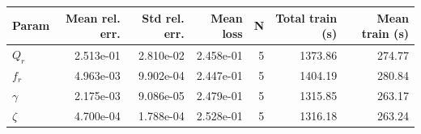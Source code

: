 \begin{tabular}{lrrrrrr}
\hline
Param & Mean rel. err. & Std rel. err. & Mean loss & N & Total train (s) & Mean train (s) \\
\hline
$Q_r$ & 2.513e-01 & 2.810e-02 & 2.458e-01 & 5 & 1373.86 & 274.77 \\
$f_r$ & 4.963e-03 & 9.902e-04 & 2.447e-01 & 5 & 1404.19 & 280.84 \\
$\gamma$ & 2.175e-03 & 9.086e-05 & 2.479e-01 & 5 & 1315.85 & 263.17 \\
$\zeta$ & 4.700e-04 & 1.788e-04 & 2.528e-01 & 5 & 1316.18 & 263.24 \\
\hline
\end{tabular}
